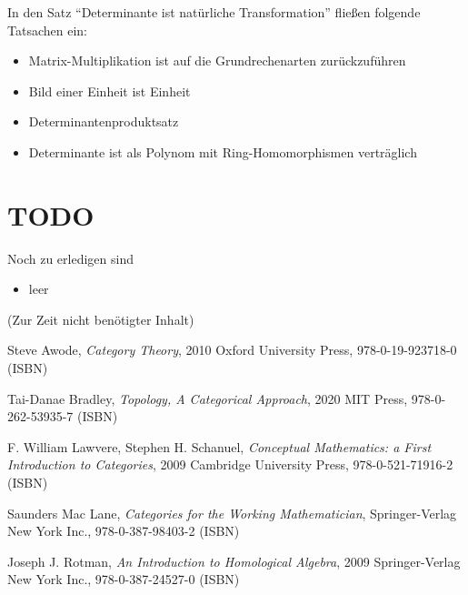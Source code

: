 \documentclass[a4paper]{amsart}
\theoremstyle{definition}
\begin{document}
In den Satz "`Determinante ist natürliche Transformation"' fließen folgende Tatsachen ein: 
\begin{itemize}
   \item Matrix-Multiplikation ist auf die Grundrechenarten zurückzuführen
   \item Bild einer Einheit ist Einheit
   \item Determinantenproduktsatz
   \item Determinante ist als Polynom mit Ring-Homomorphismen verträglich
\end{itemize}

\section{TODO}
\begin{backup}
Noch zu erledigen sind
\begin{itemize}
   \item leer
\end{itemize}
\end{backup}

\begin{backup}
    (Zur Zeit nicht benötigter Inhalt)
\end{backup}

\begin{thebibliography}{9}
      Steve Awode, \emph{Category Theory},
      2010 Oxford University Press, 978-0-19-923718-0 (ISBN)

      Tai-Danae Bradley, \emph{Topology, A Categorical Approach},
      2020 MIT Press, 978-0-262-53935-7 (ISBN)

      F. William Lawvere, Stephen H. Schanuel, \emph{Conceptual Mathematics: a First Introduction to Categories},
      2009 Cambridge University Press, 978-0-521-71916-2 (ISBN)

      Saunders Mac Lane, \emph{Categories for the Working Mathematician},
      Springer-Verlag New York Inc., 978-0-387-98403-2 (ISBN)

   	Joseph J. Rotman, \emph{An Introduction to Homological Algebra},
   	2009 Springer-Verlag New York Inc., 978-0-387-24527-0 (ISBN)
      
\end{thebibliography}
\end{document}
